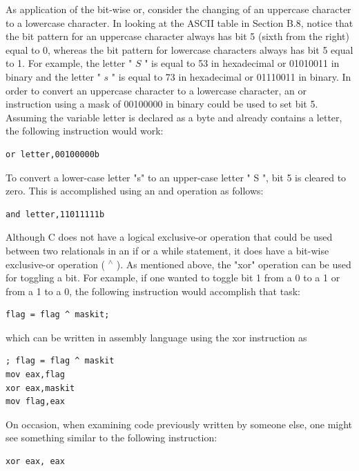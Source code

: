 \documentclass[10pt]{book}
\begin{document}
As application of the bit-wise or, consider the changing of an uppercase character to a lowercase character. In looking at the ASCII table in Section B.8, notice that the bit pattern for an uppercase character always has bit 5 (sixth from the right) equal to 0, whereas the bit pattern for lowercase characters always has bit 5 equal to 1. For example, the letter " $S$ " is equal to 53 in hexadecimal or 01010011 in binary and the letter " $s$ " is equal to 73 in hexadecimal or 01110011 in binary. In order to convert an uppercase character to a lowercase character, an or instruction using a mask of 00100000 in binary could be used to set bit 5. Assuming the variable letter is declared as a byte and already contains a letter, the following instruction would work:

\begin{verbatim}
or letter,00100000b
\end{verbatim}

To convert a lower-case letter "s" to an upper-case letter " S ", bit 5 is cleared to zero. This is accomplished using an and operation as follows:

\begin{verbatim}
and letter,11011111b
\end{verbatim}

Although C does not have a logical exclusive-or operation that could be used between two relationals in an if or a while statement, it does have a bit-wise exclusive-or operation ( ${ }^{\wedge}$ ). As mentioned above, the "xor" operation can be used for toggling a bit. For example, if one wanted to toggle bit 1 from a 0 to a 1 or from a 1 to a 0, the following instruction would accomplish that task:

\begin{verbatim}
flag = flag ^ maskit;
\end{verbatim}

which can be written in assembly language using the xor instruction as
\begin{verbatim}
; flag = flag ^ maskit
mov eax,flag
xor eax,maskit
mov flag,eax
\end{verbatim}

On occasion, when examining code previously written by someone else, one might see something similar to the following instruction:

\begin{verbatim}
xor eax, eax
\end{verbatim}
\end{document}
